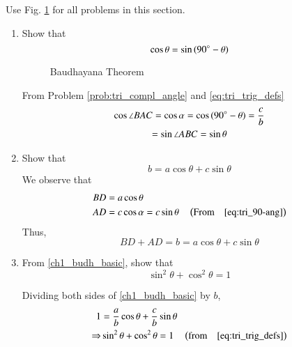 Use Fig. \ref{fig:tri_baudh} for all problems in this section.
\renewcommand{\theequation}{\theenumi}
\begin{enumerate}[label=\arabic*.,ref=\thesubsection.\theenumi]



\item  Show that
	\begin{equation}
	\cos \theta = \sin \left(90\degree - \theta\right)
	\label{eq:tri_baudh_comp}	
	\end{equation}


\begin{figure}[!ht]
	\begin{center}
		\resizebox{\columnwidth}{!}{}
	\end{center}
	\caption{Baudhayana Theorem}
	\label{fig:tri_baudh}	
\end{figure}


\solution From Problem \ref{prob:tri_compl_angle} and  \eqref{eq:tri_trig_defs}
%
\begin{multline}
\label{eq:tri_90-ang}
\cos \angle BAC = \cos \alpha =	\cos \left(90\degree-\theta\right) = \frac{c}{b} 
\\
= \sin \angle ABC = \sin \theta
\end{multline}
%
\item
Show that 
%
\begin{equation}
\label{ch1_budh_basic}
b = a \cos \theta + c \sin \theta
\end{equation}
%
\solution We observe that
%
\begin{align}
BD &= a \cos \theta \\
AD &= c \cos\alpha = c \sin \theta \quad \left(\text{From} \quad \eqref{eq:tri_90-ang}
\right)
\end{align}
%
Thus,
\begin{equation}
BD + AD = b = a \cos \theta + c \sin \theta
\end{equation}
\item
From \eqref{ch1_budh_basic}, show that
%
\begin{equation}
%
\label{eq:tri_sin_cos_id}
\sin ^2 \theta + \cos ^2 \theta = 1
\end{equation}


%
\solution Dividing both sides of \eqref{ch1_budh_basic} by $b$, 
\begin{align}
1 &= \frac{a}{b}\cos\theta + \frac{c}{b}\sin\theta\\
\Rightarrow &\sin ^2 \theta + \cos ^2 \theta = 1 \quad \left(\text{from} \quad \eqref{eq:tri_trig_defs}\right)
\end{align}


\end{enumerate}
